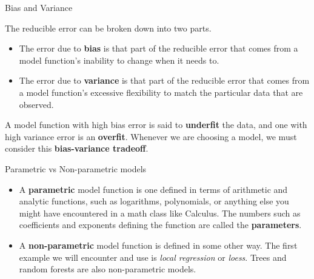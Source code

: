\documentclass[
  ignorenonframetext,
]{beamer}
\providecommand{\tightlist}{%
  \setlength{\itemsep}{0pt}\setlength{\parskip}{0pt}}
\begin{document}
\begin{frame}{Bias and Variance}
\protect\hypertarget{bias-and-variance}{}

The reducible error can be broken down into two parts.

\begin{itemize}
\tightlist
\item
  The error due to \textbf{bias} is that part of the reducible error
  that comes from a model function's inability to change when it needs
  to.
\item
  The error due to \textbf{variance} is that part of the reducible error
  that comes from a model function's excessive flexibility to match the
  particular data that are observed.
\end{itemize}

A model function with high bias error is said to \textbf{underfit} the
data, and one with high variance error is an \textbf{overfit}. Whenever
we are choosing a model, we must consider this \textbf{bias-variance
tradeoff}.

\end{frame}

\begin{frame}{Parametric vs Non-parametric models}
\protect\hypertarget{parametric-vs-non-parametric-models}{}

\begin{itemize}
\tightlist
\item
  A \textbf{parametric} model function is one defined in terms of
  arithmetic and analytic functions, such as logarithms, polynomials, or
  anything else you might have encountered in a math class like
  Calculus. The numbers such as coefficients and exponents defining the
  function are called the \textbf{parameters}.
\item
  A \textbf{non-parametric} model function is defined in some other way.
  The first example we will encounter and use is \emph{local regression}
  or \emph{loess}. Trees and random forests are also non-parametric
  models.
\end{itemize}

\end{frame}
\end{document}
